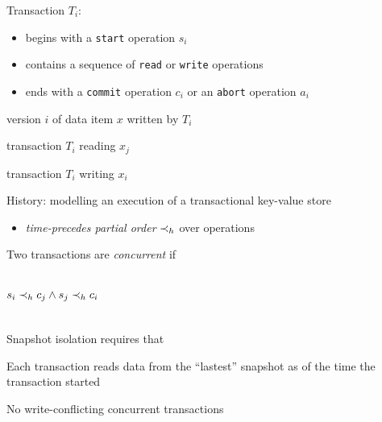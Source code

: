 \begin{frame}{}
  Transaction $T_i$:
  \begin{itemize}
    \item begins with a \texttt{start} operation $s_i$ 
    \item contains a sequence of \texttt{read} or \texttt{write} operations
    \item ends with a \texttt{commit} operation $c_i$ or an \texttt{abort} operation $a_i$
  \end{itemize}

  \pause
  \vspace{0.30cm}
  \begin{description}[$w_i(x_i)$:]
    \item[$x_i$:] version $i$ of data item $x$ written by $T_i$
    \item[$r_i(x_j)$:] transaction $T_i$ reading $x_j$
    \item[$w_i(x_i)$:] transaction $T_i$ writing $x_i$
  \end{description}
\end{frame}

\begin{frame}{}
  History: modelling an execution of a transactional key-value store
  \begin{itemize}
    \item \emph{time-precedes partial order} $\prec_{h}$ over operations
  \end{itemize}

  \pause
  \vspace{0.50cm}
  Two transactions are \emph{concurrent} if
  \begin{columns}
      \[
	s_i \prec_{h} c_j \land s_j \prec_{h} c_i
      \]
  \end{columns}
\end{frame}

\begin{frame}{}
  Snapshot isolation requires that
  \vspace{10pt}
  \begin{description}
    \item[Snapshot Read:] Each transaction reads data from the ``lastest'' snapshot as of the time the transaction started
    \item[Snapshot Write:] No write-conflicting concurrent transactions
  \end{description}
\end{frame}

